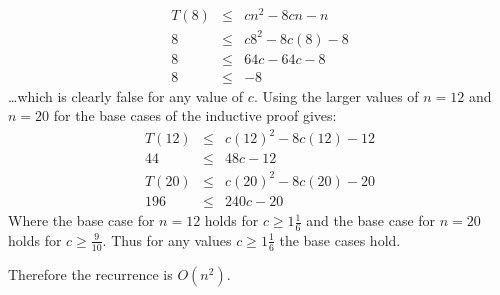 \begin{eqnarray*}
	T(8) & \leq & cn^2 - 8cn - n \\
	8 & \leq & c8^2 - 8c(8) - 8 \\
	8 & \leq & 64c - 64c - 8 \\
	8 & \leq & -8
\end{eqnarray*}
\ldots which is clearly false for any value of $c$.  Using the larger values of $n = 12$ and $n = 20$ for the base cases of the inductive proof gives:
\begin{eqnarray*}
	T(12) & \leq & c(12)^2 - 8c(12) - 12 \\
	44 & \leq & 48c - 12 \\
	T(20) & \leq & c(20)^2 - 8c(20) - 20 \\
	196 & \leq & 240c - 20
\end{eqnarray*}
Where the base case for $n = 12$ holds for $c \geq 1 \frac{1}{6}$ and the base case for $n = 20$ holds for $c \geq \frac{9}{10}$.  Thus for any values $c \geq 1 \frac{1}{6}$ the base cases hold.

Therefore the recurrence is $O(n^2)$.
